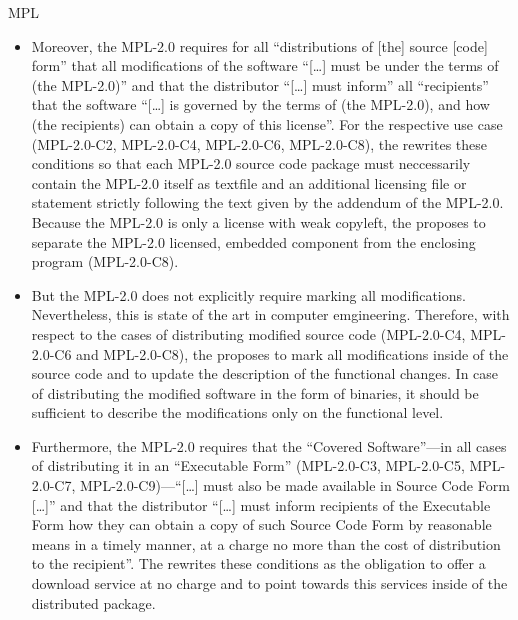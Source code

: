 \begin{license}{MPL}
\begin{itemize}
\item Moreover, the MPL-2.0 requires for all \enquote{distributions of [the]
  source [code] form} that all modifications of the software \enquote{[\ldots] 
  must be under the terms of (the MPL-2.0)} and that the distributor
  \enquote{[\ldots] must inform} all \enquote{recipients} that the software
  \enquote{[\ldots] is governed by the terms of (the MPL-2.0), and how (the
  recipients) can obtain a copy of this license}.  For the
  respective use case (MPL-2.0-C2, MPL-2.0-C4, MPL-2.0-C6, MPL-2.0-C8), the
  \oslic{} rewrites these conditions so that each MPL-2.0 source code package
  must neccessarily contain the MPL-2.0 itself as textfile and an additional 
  licensing file or statement strictly following the text given by the addendum
  of the MPL-2.0. Because the MPL-2.0 is only a license with
  weak copyleft, the \oslic{} proposes to separate the MPL-2.0 licensed,
  embedded component from the enclosing program (MPL-2.0-C8). 
  
\item But the MPL-2.0 does not explicitly require marking all modifications.
  Nevertheless, this is state of the art in computer emgineering. Therefore,
  with respect to the cases of distributing modified source code (MPL-2.0-C4,
  MPL-2.0-C6 and MPL-2.0-C8), the \oslic{} proposes to mark all modifications
  inside of the source code and to update the description of the functional
  changes. In case of distributing the modified software in the form of
  binaries, it should be sufficient to describe the modifications only on the
  functional level. 
  
\item Furthermore, the MPL-2.0 requires that the \enquote{Covered Software}---in 
  all cases of distributing it in an \enquote{Executable Form} (MPL-2.0-C3,
  MPL-2.0-C5, MPL-2.0-C7, MPL-2.0-C9)---\enquote{[\ldots] must also be made
  available in Source Code Form [\ldots]} and that the distributor
  \enquote{[\ldots] must inform recipients of the Executable Form how they can
  obtain a copy of such Source Code Form by reasonable means in a timely manner,
  at a charge no more than the cost of distribution to the
  recipient}.  The \oslic{} rewrites these conditions as the
  obligation to offer a download service at no charge and to point towards this
  services inside of the distributed package.
  

\end{itemize}
\end{license}
